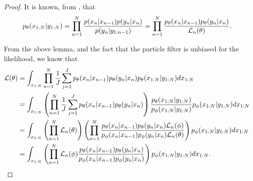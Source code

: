 \documentclass{article}
\begin{document}
\begin{proof}
    It is known, from \cite{doucet2009tutorial}, that 
    $$p_\theta(x_{1:N}|y_{1:N}) = \prod_{n=1}^N \frac{p(x_n|x_{n-1})p(y_n|x_n)}{p(y_n|y_{1:n-1})} = \prod_{n=1}^N \frac{p_\theta(x_n|x_{n-1})p_\theta(y_n|x_n)}{\mathcal{L}_n(\theta)}.$$

    From the above lemma, and the fact that the particle filter is unbiased for the likelihood, we know that
    \begin{align*}
        \mathcal{L}(\theta)
        &= \int_{x_{1:N}} \prod_{n=1}^N \frac{1}{J}\sum_{j=1}^J p_\theta(x_n|x_{n-1})p_\theta(y_n|x_n) p_\theta(x_{1:N}|y_{1:N}) dx_{1:N} \\
        &= \int_{x_{1:N}} \left(\prod_{n=1}^N \frac{1}{J}\sum_{j=1}^J p_\theta(x_n|x_{n-1})p_\theta(y_n|x_n) \right) \frac{p_\theta(x_{1:N}|y_{1:N})}{p_\phi(x_{1:N}|y_{1:N})}p_\phi(x_{1:N}|y_{1:N}) dx_{1:N}\\
        &= \int_{x_{1:N}} \left(\prod_{n=1}^N \mathcal{L}_n(\theta) \right) \left(\prod_{n=1}^N \frac{p_\theta(x_n|x_{n-1})p_\theta(y_n|x_n) \mathcal{L}_n(\phi)}{p_\phi(x_n|x_{n-1})p_\phi(y_n|x_n) \mathcal{L}_n(\theta)}\right)p_\phi(x_{1:N}|y_{1:N}) dx_{1:N} \\ 
        &= \int_{x_{1:N}} \left(\prod_{n=1}^N \mathcal{L}_n(\phi) \frac{p_\theta(x_n|x_{n-1})p_\theta(y_n|x_n)}{p_\phi(x_n|x_{n-1})p_\phi(y_n|x_n) }\right)p_\phi(x_{1:N}|y_{1:N}) dx_{1:N}.
    \end{align*}


\end{proof}
\end{document}
